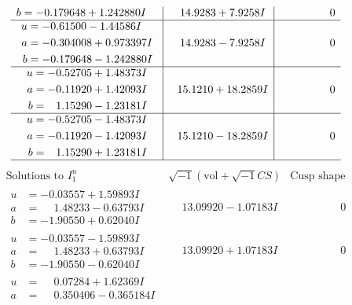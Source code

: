 \documentclass[1p]{elsarticle_modified}
\theoremstyle{definition}
\newcommand{\I}{\sqrt{-1}}
\begin{document}
$$\begin{array}{c|c|c}
\begin{aligned}
b &= -0.179648 + 1.242880 I\end{aligned}
 & \phantom{-}14.9283 + 7.9258 I & \phantom{-0.000000 } 0 \\ \hline\begin{aligned}
u &= -0.61500 - 1.44586 I \\
a &= -0.304008 + 0.973397 I \\
b &= -0.179648 - 1.242880 I\end{aligned}
 & \phantom{-}14.9283 - 7.9258 I & \phantom{-0.000000 } 0 \\ \hline\begin{aligned}
u &= -0.52705 + 1.48373 I \\
a &= -0.11920 + 1.42093 I \\
b &= \phantom{-}1.15290 - 1.23181 I\end{aligned}
 & \phantom{-}15.1210 + 18.2859 I & \phantom{-0.000000 } 0 \\ \hline\begin{aligned}
u &= -0.52705 - 1.48373 I \\
a &= -0.11920 - 1.42093 I \\
b &= \phantom{-}1.15290 + 1.23181 I\end{aligned}
 & \phantom{-}15.1210 - 18.2859 I & \phantom{-0.000000 } 0\\
 \hline 
 \end{array}$$\newpage$$\begin{array}{c|c|c}  
\text{Solutions to }I^u_{1}& \I (\text{vol} + \sqrt{-1}CS) & \text{Cusp shape}\\
 \hline 
\begin{aligned}
u &= -0.03557 + 1.59893 I \\
a &= \phantom{-}1.48233 - 0.63793 I \\
b &= -1.90550 + 0.62040 I\end{aligned}
 & \phantom{-}13.09920 - 1.07183 I & \phantom{-0.000000 } 0 \\ \hline\begin{aligned}
u &= -0.03557 - 1.59893 I \\
a &= \phantom{-}1.48233 + 0.63793 I \\
b &= -1.90550 - 0.62040 I\end{aligned}
 & \phantom{-}13.09920 + 1.07183 I & \phantom{-0.000000 } 0 \\ \hline\begin{aligned}
u &= \phantom{-}0.07284 + 1.62369 I \\
a &= \phantom{-}0.350406 - 0.365184 I \\

\end{aligned}
\end{array}$$
\end{document}
